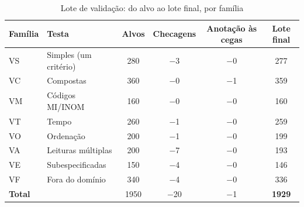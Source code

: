 \begin{table}[htbp!]
\centering
\caption{Lote de validação: do alvo ao lote final, por família}
\label{tab:lote_composicao}
\footnotesize
\begin{tabular}{|l|l|c|c|c|c|}
\hline
\textbf{Família} & \textbf{Testa} & \textbf{Alvos} & \textbf{Checagens} & \textbf{Anotação às cegas} & \textbf{Lote final} \\
\hline
VS & Simples (um critério) & 280 & $-$3 & $-$0 & 277 \\
VC & Compostas & 360 & $-$0 & $-$1 & 359 \\
VM & Códigos MI/INOM & 160 & $-$0 & $-$0 & 160 \\
VT & Tempo & 260 & $-$1 & $-$0 & 259 \\
VO & Ordenação & 200 & $-$1 & $-$0 & 199 \\
VA & Leituras múltiplas & 200 & $-$7 & $-$0 & 193 \\
VE & Subespecificadas & 150 & $-$4 & $-$0 & 146 \\
VF & Fora do domínio & 340 & $-$4 & $-$0 & 336 \\
\hline
\textbf{Total} & & 1950 & $-$20 & $-$1 & \textbf{1929} \\
\hline
\end{tabular}
\end{table}
